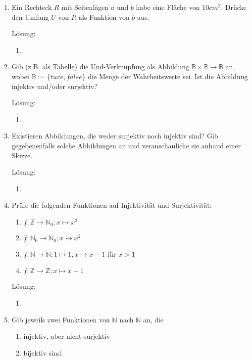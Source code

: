 \documentclass[main.tex]{subfiles}
\begin{document}
\begin{enumerate}
	\item Ein Rechteck \( R \) mit Seitenlägen \( a \) und \( b \)
	      habe eine Fläche von \( 10 cm^2 \). Drücke den Umfang \( U \) von \( R \) als Funktion von \( b \) aus.

	      Lösung:
	      \begin{enumerate}
		      \item
	      \end{enumerate}
	\item  Gib (z.B. als Tabelle) die Und-Verknüpfung als Abbildung \( \mathbb{B} \times \mathbb{B} \rightarrow \mathbb{B} \) an,
	      wobei \( \mathbb{B} := \{ ture, false \} \) die Menge der Wahrheitswerte sei.
	      Ist die Abbildung injektiv und/oder surjektiv?

	      Lösung:
	      \begin{enumerate}
		      \item
	      \end{enumerate}
	\item Existieren Abbildungen, die weder surjektiv noch injektiv sind?
	      Gib gegebenenfalls solche Abbildungen an und veranschauliche sie anhand einer Skizze.

	      Lösung:
	      \begin{enumerate}
		      \item
	      \end{enumerate}
	\item Prüfe die folgenden Funktionen auf Injektivität und Surjektivität:
	      \begin{enumerate}
		      \item \( f: \mathbb{Z} \rightarrow \mathbb{N}_0 ; x \mapsto x^2 \)
		      \item \( f: \mathbb{N}_0 \rightarrow \mathbb{N}_0 ; x \mapsto x^2 \)
		      \item \( f: \mathbb{N} \rightarrow \mathbb{N}; 1 \mapsto 1, x \mapsto x - 1 \) für \( x > 1 \)
		      \item \( f: \mathbb{Z} \rightarrow \mathbb{Z}; x \mapsto x - 1 \)
	      \end{enumerate}

	      Lösung:
	      \begin{enumerate}
		      \item
	      \end{enumerate}
	\item Gib jeweils zwei Funktionen von \( \mathbb{N} \) nach \( \mathbb{N} \) an, die
	      \begin{enumerate}
		      \item injektiv, aber nicht surjektiv
		      \item bijektiv sind.
	      \end{enumerate}


\end{enumerate}
\end{document}
